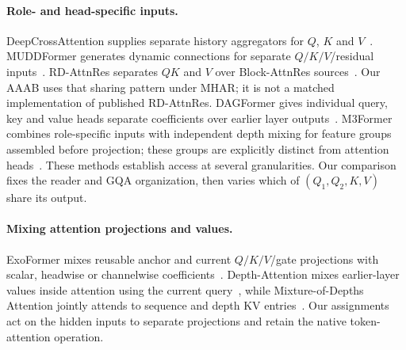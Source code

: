 \documentclass[11pt,letterpaper]{article}
\newcommand{\route}[1]{\textsf{#1}}
\begin{document}
\paragraph{Role- and head-specific inputs.}
DeepCrossAttention supplies separate history aggregators for
$Q$, $K$ and $V$~\cite{dca2025}. %
MUDDFormer generates dynamic connections for separate
$Q/K/V$/residual inputs~\cite{mudd2025}. %
RD-AttnRes separates $QK$ and $V$ over Block-AttnRes
sources~\cite{rd2026}. %
Our \route{AAAB} uses that sharing pattern under MHAR; it is not a matched
implementation of published RD-AttnRes.
DAGFormer gives individual query, key and value heads separate
coefficients over earlier layer outputs~\cite{dagformer2026}. %
M3Former combines role-specific inputs with independent depth mixing for
feature groups assembled before projection; these groups are explicitly
distinct from attention heads~\cite{m3former2026}. %
These methods establish access at several granularities. Our comparison
fixes the reader and GQA organization, then varies which of
$(Q_1,Q_2,K,V)$ share its output.

\paragraph{Mixing attention projections and values.}
ExoFormer mixes reusable anchor and current $Q/K/V$/gate projections with
scalar, headwise or channelwise coefficients~\cite{exoformer2026}. %
Depth-Attention mixes earlier-layer values inside attention using the
current query~\cite{depthattention2026}, %
while Mixture-of-Depths Attention jointly attends to sequence and depth
KV entries~\cite{moda2026}. %
Our assignments act on the hidden inputs to separate projections and retain
the native token-attention operation.
\end{document}
